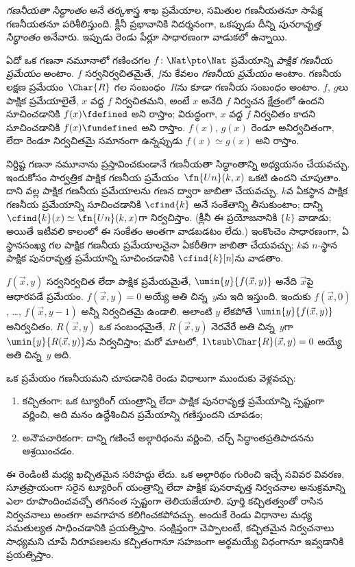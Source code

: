 \documentclass[../../../include/open-logic-section]{subfiles}
\begin{document}

\emph{గణనీయతా సిద్ధాంతం} అనే తర్కశాస్త్ర శాఖ ప్రమేయాల, సమితుల
గణనీయతనూ సాపేక్ష గణనీయతనూ పరిశీలిస్తుంది. క్లీనీ ప్రభావానికి నిదర్శనంగా, ఒకప్పుడు
దీన్ని \emph{పునరావృత్త సిద్ధాంతం} అనేవారు. ఇప్పుడు రెండు పేర్లూ సాధారణంగా వాడుకలో ఉన్నాయి.

ఏదో ఒక గణనా నమూనాలో గణించగల $f\colon \Nat \pto \Nat$ ప్రమేయాన్ని
\emph{పాక్షిక గణనీయ ప్రమేయం} అంటాం. $f$ సర్వనిర్వచితమైతే, $f$ను
కేవలం \emph{గణనీయ ప్రమేయం} అంటాం. గణనీయ లక్షణ ప్రమేయం~$\Char{R}$
గల సంబంధం~$R$ను కూడా గణనీయ సంబంధం అంటాం. $f$, $g$లు పాక్షిక
ప్రమేయాలైతే, $x$ వద్ద $f$ నిర్వచితమని, అంటే $x$ అనేది $f$ నిర్వచన
క్షేత్రంలో ఉందని సూచించడానికి $f(x) \fdefined$ అని రాస్తాం;
విరుద్ధంగా, $x$ వద్ద $f$ నిర్వచితం కాదని సూచించడానికి $f(x)
\fundefined$ అని రాస్తాం. $f(x)$, $g(x)$ రెండూ అనిర్వచితంగా, లేదా
రెండూ నిర్వచితమై సమానంగా ఉన్నప్పుడు $f(x) \simeq g(x)$ అని రాస్తాం.

నిర్దిష్ట గణనా నమూనాను ప్రస్తావించకుండానే గణనీయతా సిద్ధాంతాన్ని
అధ్యయనం చేయవచ్చు. ఇందుకోసం సార్వత్రిక పాక్షిక గణనీయ
ప్రమేయం~$\fn{Un}(k, x)$ ఒకటి ఉందని చూపుతాం. దాని వల్ల పాక్షిక
గణనీయ ప్రమేయాలను గణన ద్వారా జాబితా చేయవచ్చు. $k$వ ఏకస్థాన పాక్షిక గణనీయ ప్రమేయాన్ని
సూచించడానికి $\cfind{k}$ అనే సంకేతాన్ని తీసుకుంటాం; దాన్ని
$\cfind{k}(x) \simeq \fn{Un}(k, x)$గా నిర్వచిస్తాం. (క్లీనీ ఈ
ప్రయోజనానికి $\{ k \}$ వాడాడు; అయితే ఇటీవలి కాలంలో ఈ సంకేతం అంతగా
వాడబడటం లేదు.) ఇంకొంచెం సాధారణంగా, ఏ స్థానసంఖ్య గల పాక్షిక గణనీయ
ప్రమేయాలనైనా ఏకరీతిగా జాబితా చేయవచ్చు; $k$వ $n$-స్థాన పాక్షిక
పునరావృత్త ప్రమేయాన్ని సూచించడానికి $\cfind{k}[n]$ను వాడతాం.

$f(\vec x, y)$ సర్వనిర్వచిత లేదా పాక్షిక ప్రమేయమైతే,
$\umin{y}{f (\vec x, y)}$ అనేది $\vec x$పై ఆధారపడే ప్రమేయం.
$f(\vec x, y)=0$ అయ్యే అతి చిన్న~$y$ను ఇది ఇస్తుంది. ఇందుకు
$f(\vec x, 0)$, \dots, $f(\vec x, y-1)$ అన్నీ నిర్వచితమై ఉండాలి.
అలాంటి $y$ లేకపోతే
$\umin{y}{f (\vec x, y)}$ అనిర్వచితం. $R(\vec x,y)$ ఒక సంబంధమైతే,
$R(\vec x,y)$ నెరవేరే అతి చిన్న~$y$గా $\umin{y}{R(\vec x,y)}$ను
నిర్వచిస్తాం; మరో మాటలో, $1 \tsub \Char{R}(\vec x,y)=0$ అయ్యే అతి
చిన్న~$y$ అది.

ఒక ప్రమేయం గణనీయమని చూపడానికి రెండు విధాలుగా ముందుకు వెళ్లవచ్చు:
\begin{enumerate}
\item కచ్చితంగా: ఒక ట్యూరింగ్ యంత్రాన్ని లేదా పాక్షిక పునరావృత్త
  ప్రమేయాన్ని స్పష్టంగా వర్ణించి, అది మనం ఉద్దేశించిన ప్రమేయాన్ని
  గణిస్తుందని చూపడం;
\item అనౌపచారికంగా: దాన్ని గణించే అల్గారిథంను వర్ణించి, చర్చ్
  సిద్ధాంతప్రతిపాదనను ఆశ్రయించడం.
\end{enumerate}
ఈ రెండింటి మధ్య ఖచ్చితమైన సరిహద్దు లేదు. ఒక అల్గారిథం గురించి ఇచ్చే సవివర
వివరణ, సూత్రప్రాయంగా సరైన ట్యూరింగ్ యంత్రాన్ని లేదా పాక్షిక పునరావృత్త
నిర్వచనాల అనుక్రమాన్ని ఎలా రూపొందించవచ్చో తగినంత స్పష్టంగా తెలియజేయాలి.
పూర్తి కచ్చితత్వంతో రాసిన నిర్వచనాలు అంతగా అవగాహన కలిగించకపోవచ్చు.
అందుకే రెండు విధానాల మధ్య సమతుల్యత సాధించడానికి ప్రయత్నిస్తాం.
సంక్షిప్తంగా చెప్పాలంటే, కచ్చితమైన నిర్వచనాలు సాధ్యమని చూపే నిరూపణలను
కచ్చితంగానూ సహజంగా అర్థమయ్యే విధంగానూ ఇవ్వడానికి ప్రయత్నిస్తాం.
\end{document}
